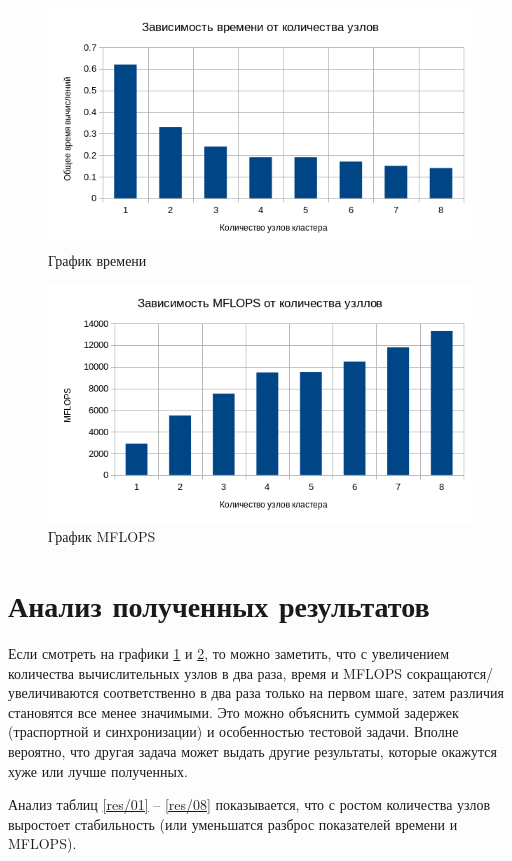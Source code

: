 \begin{figure}[H]
	\centering
	\includegraphics[width=\linewidth]{4-01}
	\caption{График времени}
	\label{plot/01}
\end{figure}


\begin{figure}[H]
	\centering
	\includegraphics[width=\linewidth]{4-02}
	\caption{График MFLOPS}
	\label{plot/02}
\end{figure}


\section{Анализ полученных результатов}

Если смотреть на графики \ref{plot/01} и \ref{plot/02}, то можно заметить, что с увеличением количества вычислительных узлов в два раза, время и MFLOPS сокращаются/увеличиваются соответственно в два раза только на первом шаге, затем различия становятся все менее значимыми. Это можно объяснить суммой задержек (траспортной и синхронизации) и особенностью тестовой задачи. Вполне вероятно, что другая задача может выдать другие результаты, которые окажутся хуже или лучше полученных.

Анализ таблиц \ref{res/01} -- \ref{res/08} показывается, что с ростом количества узлов выростоет стабильность (или уменьшатся разброс показателей времени и MFLOPS).
